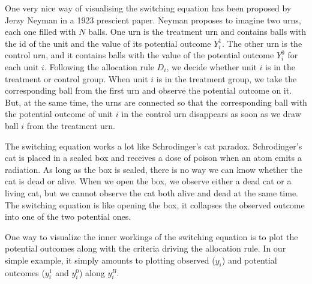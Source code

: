 \documentclass[]{book}
\theoremstyle{definition}
\theoremstyle{definition}
\theoremstyle{definition}
\theoremstyle{remark}
\let\BeginKnitrBlock\begin \let\EndKnitrBlock\end
\begin{document}
\BeginKnitrBlock{remark}
\iffalse{} {Remark. } \fi{}One very nice way of visualising the switching equation has been proposed by Jerzy Neyman in a 1923 prescient paper.
Neyman proposes to imagine two urns, each one filled with \(N\) balls.
One urn is the treatment urn and contains balls with the id of the unit and the value of its potential outcome \(Y_i^1\).
The other urn is the control urn, and it contains balls with the value of the potential outcome \(Y_i^0\) for each unit \(i\).
Following the allocation rule \(D_i\), we decide whether unit \(i\) is in the treatment or control group.
When unit \(i\) is in the treatment group, we take the corresponding ball from the first urn and observe the potential outcome on it.
But, at the same time, the urns are connected so that the corresponding ball with the potential outcome of unit \(i\) in the control urn disappears as soon as we draw ball \(i\) from the treatment urn.

The switching equation works a lot like Schrodinger's cat paradox.
Schrodinger's cat is placed in a sealed box and receives a dose of poison when an atom emits a radiation.
As long as the box is sealed, there is no way we can know whether the cat is dead or alive.
When we open the box, we observe either a dead cat or a living cat, but we cannot observe the cat both alive and dead at the same time.
The switching equation is like opening the box, it collapses the observed outcome into one of the two potential ones.
\EndKnitrBlock{remark}

\BeginKnitrBlock{example}
\protect\hypertarget{exm:unnamed-chunk-6}{}{\label{exm:unnamed-chunk-6} }One way to visualize the inner workings of the switching equation is to plot the potential outcomes along with the criteria driving the allocation rule.
In our simple example, it simply amounts to plotting observed (\(y_i\)) and potential outcomes (\(y_i^1\) and \(y_i^0\)) along \(y_i^B\).
\EndKnitrBlock{example}
\end{document}
